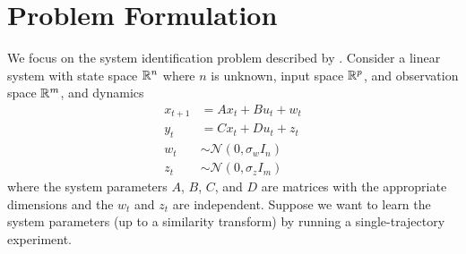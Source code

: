 \section{Problem Formulation}

We focus on the system identification problem
described by \cite{oymak2019singletraj}.
Consider a linear system with
state space $\mathbb{R}^n$ where $n$ is unknown,
input space $\mathbb{R}^p$,
and observation space $\mathbb{R}^m$,
and dynamics
\begin{align*}
x_{t+1} &= A x_t + B u_t + w_t \\
y_t &= C x_t + D u_t + z_t \\
w_t &\sim \mathcal N (0, \sigma_w I_n) \\
z_t &\sim \mathcal N (0, \sigma_z I_m)
\end{align*}
where the system parameters $A$, $B$, $C$, and $D$
are matrices with the appropriate dimensions
and the $w_t$ and $z_t$ are independent.
Suppose we want to learn the system parameters
(up to a similarity transform)
by running a single-trajectory experiment.

